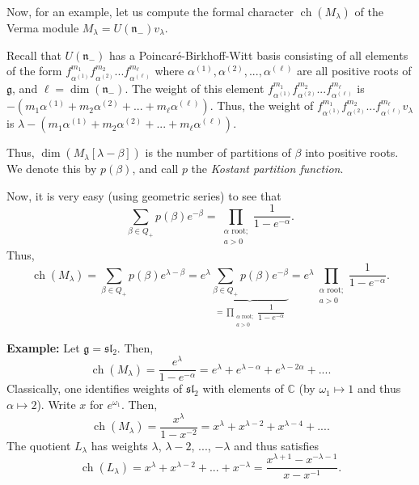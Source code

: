 \documentclass[etingof-lie.tex]{subfiles}
\begin{document}
Now, for an example, let us compute the formal character $\operatorname*{ch}%
\left(  M_{\lambda}\right)  $ of the Verma module $M_{\lambda}=U\left(
\mathfrak{n}_{-}\right)  v_{\lambda}$.

Recall that $U\left(  \mathfrak{n}_{-}\right)  $ has a
Poincar\'{e}-Birkhoff-Witt basis consisting of all elements of the form
$f_{\alpha^{\left(  1\right)  }}^{m_{1}}f_{\alpha^{\left(  2\right)  }}%
^{m_{2}}...f_{\alpha^{\left(  \ell\right)  }}^{m_{\ell}}$ where $\alpha
^{\left(  1\right)  },\alpha^{\left(  2\right)  },...,\alpha^{\left(
\ell\right)  }$ are all positive roots of $\mathfrak{g}$, and $\ell
=\dim\left(  \mathfrak{n}_{-}\right)  $. The weight of this element
$f_{\alpha^{\left(  1\right)  }}^{m_{1}}f_{\alpha^{\left(  2\right)  }}%
^{m_{2}}...f_{\alpha^{\left(  \ell\right)  }}^{m_{\ell}}$ is $-\left(
m_{1}\alpha^{\left(  1\right)  }+m_{2}\alpha^{\left(  2\right)  }+...+m_{\ell
}\alpha^{\left(  \ell\right)  }\right)  $. Thus, the weight of $f_{\alpha
^{\left(  1\right)  }}^{m_{1}}f_{\alpha^{\left(  2\right)  }}^{m_{2}%
}...f_{\alpha^{\left(  \ell\right)  }}^{m_{\ell}}v_{\lambda}$ is
$\lambda-\left(  m_{1}\alpha^{\left(  1\right)  }+m_{2}\alpha^{\left(
2\right)  }+...+m_{\ell}\alpha^{\left(  \ell\right)  }\right)  $.

Thus, $\dim\left(  M_{\lambda}\left[  \lambda-\beta\right]  \right)  $ is the
number of partitions of $\beta$ into positive roots. We denote this by
$p\left(  \beta\right)  $, and call $p$ the \textit{Kostant partition
function}.

Now, it is very easy (using geometric series) to see that%
\[
\sum\limits_{\beta\in Q_{+}}p\left(  \beta\right)  e^{-\beta}=\prod
\limits_{\substack{\alpha\text{ root;}\\a>0}}\dfrac{1}{1-e^{-\alpha}}.
\]
Thus,%
\[
\operatorname*{ch}\left(  M_{\lambda}\right)  =\sum\limits_{\beta\in Q_{+}%
}p\left(  \beta\right)  e^{\lambda-\beta}=e^{\lambda}\underbrace{\sum
\limits_{\beta\in Q_{+}}p\left(  \beta\right)  e^{-\beta}}_{=\prod
\limits_{\substack{\alpha\text{ root;}\\a>0}}\dfrac{1}{1-e^{-\alpha}}%
}=e^{\lambda}\prod\limits_{\substack{\alpha\text{ root;}\\a>0}}\dfrac
{1}{1-e^{-\alpha}}.
\]


\textbf{Example:} Let $\mathfrak{g}=\mathfrak{sl}_{2}$. Then,%
\[
\operatorname*{ch}\left(  M_{\lambda}\right)  =\dfrac{e^{\lambda}%
}{1-e^{-\alpha}}=e^{\lambda}+e^{\lambda-\alpha}+e^{\lambda-2\alpha}+....
\]
Classically, one identifies weights of $\mathfrak{sl}_{2}$ with elements of
$\mathbb{C}$ (by $\omega_{1}\mapsto1$ and thus $\alpha\mapsto2$). Write $x$
for $e^{\omega_{1}}$. Then,%
\[
\operatorname*{ch}\left(  M_{\lambda}\right)  =\dfrac{x^{\lambda}}{1-x^{-2}%
}=x^{\lambda}+x^{\lambda-2}+x^{\lambda-4}+....
\]
The quotient $L_{\lambda}$ has weights $\lambda$, $\lambda-2$, $...$,
$-\lambda$ and thus satisfies%
\[
\operatorname*{ch}\left(  L_{\lambda}\right)  =x^{\lambda}+x^{\lambda
-2}+...+x^{-\lambda}=\dfrac{x^{\lambda+1}-x^{-\lambda-1}}{x-x^{-1}}.
\]
\end{document}
